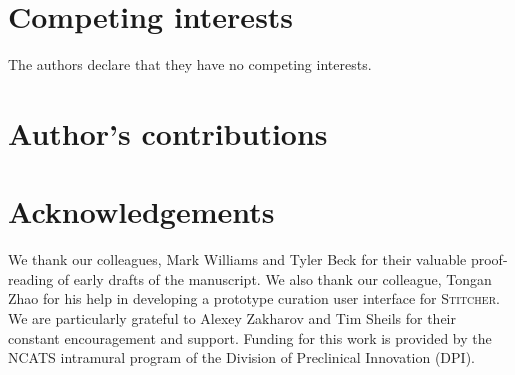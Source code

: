 \documentclass{bmcart}
\newcommand\st{\textsc{Stitcher}}
\begin{document}
\begin{backmatter}

\section*{Competing interests}
  The authors declare that they have no competing interests.

\section*{Author's contributions}


\section*{Acknowledgements}
We thank our colleagues, Mark Williams and Tyler Beck for their
valuable proof-reading of early drafts of the manuscript. We also
thank our colleague, Tongan Zhao for his help in developing a
prototype curation user interface for \st. We are particularly grateful
to Alexey Zakharov and Tim Sheils for their constant encouragement and
support. Funding for this work is provided by the NCATS intramural
program of the Division of Preclinical Innovation (DPI).




\end{backmatter}
\end{document}
